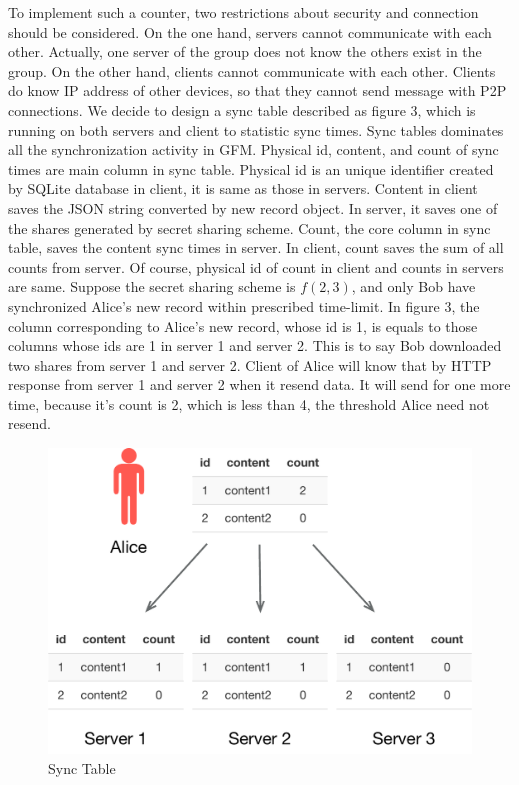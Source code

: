 \documentclass[twocolumn,10pt]{article}
\begin{document}
To implement such a counter, two restrictions about security and connection should be considered. On the one hand, servers cannot communicate with each other. Actually, one server of the group does not know the others exist in the group. On the other hand, clients cannot communicate with each other. Clients do know IP address of other devices, so that they cannot send message with P2P connections. We decide to design a sync table described as figure 3, which is running on both servers and client to statistic sync times. Sync tables dominates all the synchronization activity in GFM. Physical id, content, and count of sync times are main column in sync table. Physical id is an unique identifier created by SQLite database in client, it is same as those in servers. Content in client saves the JSON string converted by new record object. In server, it saves one of the shares generated by secret sharing scheme. Count, the core column in sync table, saves the content sync times in server. In client, count saves the sum of all counts from server. Of course, physical id of count in client and counts in servers are same. Suppose the secret sharing scheme is $f(2, 3)$, and only Bob have synchronized Alice's new record within prescribed time-limit. In figure 3, the column corresponding to Alice's new record, whose id is 1, is equals to those columns whose ids are 1 in server 1 and server 2. This is to say Bob downloaded two shares from server 1 and server 2. Client of Alice will know that by HTTP response from server 1 and server 2 when it resend data. It will send for one more time, because it's count is 2, which is less than 4, the threshold Alice need not resend.

\begin{figure}[t]
\centering
\includegraphics[scale=0.4]{sync_table}
\caption{Sync Table}
\end{figure}
\end{document}
